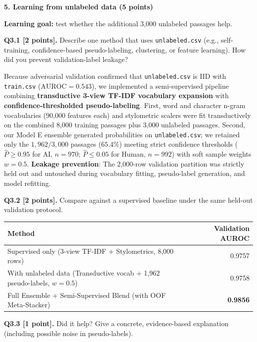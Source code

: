\documentclass[11pt,letterpaper]{article}
\begin{document}
\vspace{6pt}
{\large\textbf{5. Learning from unlabeled data (5 points)}}
\vspace{2pt}

\textbf{Learning goal:} test whether the additional 3,000 unlabeled passages help.

\vspace{3pt}
\textbf{Q3.1 [2 points].} Describe one method that uses \texttt{unlabeled.csv} (e.g., self-training, confidence-based pseudo-labeling, clustering, or feature learning). How did you prevent validation-label leakage?

Because adversarial validation confirmed that \texttt{unlabeled.csv} is IID with \texttt{train.csv} ($\text{AUROC} = 0.543$), we implemented a semi-supervised pipeline combining \textbf{transductive 3-view TF-IDF vocabulary expansion} with \textbf{confidence-thresholded pseudo-labeling}. First, word and character n-gram vocabularies (90,000 features each) and stylometric scalers were fit transductively on the combined 8,000 training passages plus 3,000 unlabeled passages. Second, our Model E ensemble generated probabilities on \texttt{unlabeled.csv}; we retained only the $1,962 / 3,000$ passages ($65.4\%$) meeting strict confidence thresholds ($\hat{P} \ge 0.95$ for AI, $n=970$; $\hat{P} \le 0.05$ for Human, $n=992$) with soft sample weights $w = 0.5$. \textbf{Leakage prevention}: The 2,000-row validation partition was strictly held out and untouched during vocabulary fitting, pseudo-label generation, and model refitting.

\vspace{3pt}
\textbf{Q3.2 [2 points].} Compare against a supervised baseline under the same held-out validation protocol.

\vspace{2pt}
{\small
\begin{tabularx}{0.85\textwidth}{@{}Xr@{}}
\toprule
\textbf{Method} & \textbf{Validation AUROC} \\
\midrule
Supervised only (3-view TF-IDF + Stylometrics, 8,000 rows) & 0.9757 \\
With unlabeled data (Transductive vocab + 1,962 pseudo-labels, $w=0.5$) & 0.9758 \\
Full Ensemble + Semi-Supervised Blend (with OOF Meta-Stacker) & \textbf{0.9856} \\
\bottomrule
\end{tabularx}
}

\vspace{3pt}
\textbf{Q3.3 [1 point].} Did it help? Give a concrete, evidence-based explanation (including possible noise in pseudo-labels).
\end{document}

